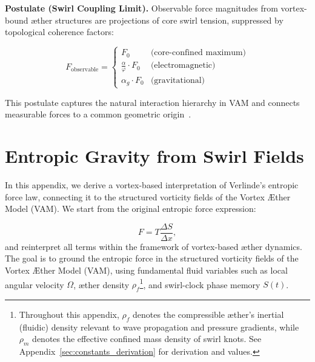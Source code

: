 \documentclass[preprint]{revtex4-2}
\begin{document}
            \textbf{Postulate (Swirl Coupling Limit).} Observable force magnitudes from vortex-bound æther structures are projections of core swirl tension, suppressed by topological coherence factors:
        
            \begin{equation}
            F_{\text{observable}} = \left\{
            \begin{array}{ll}
            F_0 & \text{(core-confined maximum)} \\
            \frac{\alpha}{\varphi} \cdot F_0 & \text{(electromagnetic)} \\
            \alpha_g \cdot F_0 & \text{(gravitational)}
            \end{array}
            \right.
            \end{equation}
        
            This postulate captures the natural interaction hierarchy in VAM and connects measurable forces to a common geometric origin~\cite{kleckner2013knots}.
        \section{Entropic Gravity from Swirl Fields}\label{sec:verlinde_mapping}
            In this appendix, we derive a vortex-based interpretation of Verlinde's entropic force law, connecting it to the structured vorticity fields of the Vortex \AE{}ther Model (VAM). We start from the original entropic force expression:

            \begin{equation}
                F = T \frac{\Delta S}{\Delta x},
            \end{equation}
            and reinterpret all terms within the framework of vortex-based æther dynamics. The goal is to ground the entropic force in the structured vorticity fields of the Vortex \AE ther Model (VAM), using fundamental fluid variables such as local angular velocity $\Omega$, æther density $\rho_{\scriptscriptstyle\boldsymbol\!f}$\footnote{Throughout this appendix, \(\rho_{\scriptscriptstyle\boldsymbol\!f}\) denotes the compressible æther’s inertial (fluidic) density relevant to wave propagation and pressure gradients, while \(\rho_{\scriptscriptstyle\boldsymbol\!m}\) denotes the effective confined mass density of swirl knots. See Appendix~\ref{sec:constants_derivation} for derivation and values.}, and swirl-clock phase memory $S(t)$.
\end{document}
